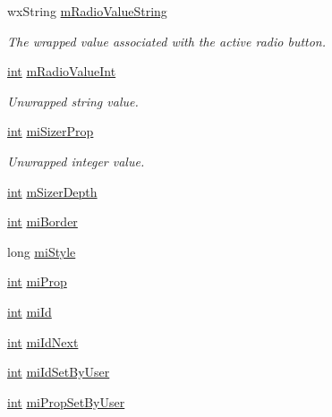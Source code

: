 \begin{DoxyCompactItemize}
wx\+String \hyperlink{class_shuttle_gui_base_a3aab5135c6827aff3c8bdbade82690d9}{m\+Radio\+Value\+String}
\begin{DoxyCompactList}\small\item\em The wrapped value associated with the active radio button. \end{DoxyCompactList}\item 
\hyperlink{xmltok_8h_a5a0d4a5641ce434f1d23533f2b2e6653}{int} \hyperlink{class_shuttle_gui_base_a3a564bf16e8c72854211bf3dffd483fc}{m\+Radio\+Value\+Int}
\begin{DoxyCompactList}\small\item\em Unwrapped string value. \end{DoxyCompactList}\item 
\hyperlink{xmltok_8h_a5a0d4a5641ce434f1d23533f2b2e6653}{int} \hyperlink{class_shuttle_gui_base_a77a21d3baf6e719f2359f5292eb5c853}{mi\+Sizer\+Prop}
\begin{DoxyCompactList}\small\item\em Unwrapped integer value. \end{DoxyCompactList}\item 
\hyperlink{xmltok_8h_a5a0d4a5641ce434f1d23533f2b2e6653}{int} \hyperlink{class_shuttle_gui_base_a6329ff4e44e13ca2f5d7aaea1584481c}{m\+Sizer\+Depth}
\item 
\hyperlink{xmltok_8h_a5a0d4a5641ce434f1d23533f2b2e6653}{int} \hyperlink{class_shuttle_gui_base_a1994985a93b3050f293e258697a624d7}{mi\+Border}
\item 
long \hyperlink{class_shuttle_gui_base_a4d3cb6967df988aa21fd00904ea8d43a}{mi\+Style}
\item 
\hyperlink{xmltok_8h_a5a0d4a5641ce434f1d23533f2b2e6653}{int} \hyperlink{class_shuttle_gui_base_a7ffb57d7c3f1aca43e2d3b8357ecd6a5}{mi\+Prop}
\item 
\hyperlink{xmltok_8h_a5a0d4a5641ce434f1d23533f2b2e6653}{int} \hyperlink{class_shuttle_gui_base_a482d02d1267275e724e07a3a4afbb3a0}{mi\+Id}
\item 
\hyperlink{xmltok_8h_a5a0d4a5641ce434f1d23533f2b2e6653}{int} \hyperlink{class_shuttle_gui_base_aae93c57a77ece4fb763126f275a7da76}{mi\+Id\+Next}
\item 
\hyperlink{xmltok_8h_a5a0d4a5641ce434f1d23533f2b2e6653}{int} \hyperlink{class_shuttle_gui_base_a7b83dde81ded2ba90c127b32b063d8b8}{mi\+Id\+Set\+By\+User}
\item 
\hyperlink{xmltok_8h_a5a0d4a5641ce434f1d23533f2b2e6653}{int} \hyperlink{class_shuttle_gui_base_ac129e63a7ecb5f50b59ef3afa7cd795e}{mi\+Prop\+Set\+By\+User}

\end{DoxyCompactItemize}
